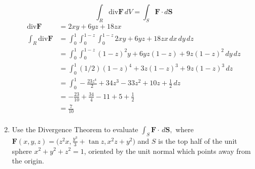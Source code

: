 \documentclass{article}
\newcommand{\divt}{\text{div}}
\begin{document}
\begin{enumerate}
            \[\int_R \divt \boldsymbol F \, dV = \int_S \boldsymbol F \cdot d\boldsymbol S\]
            \begin{align*}
                \divt \boldsymbol F &= 2xy + 6yz + 18zx \\
                \int_R \divt \boldsymbol F &= \int_0^1 \int_0^{1-z} \int_0^{1-z} 2xy + 6yz + 18zx \, dx \, dy \, dz \\
                &= \int_0^1 \int_0^{1-z} (1-z)^2y + 6yz(1-z) + 9z(1-z)^2 \, dy \, dz \\
                &= \int_0^1 (1/2)(1-z)^4 + 3z(1-z)^3 + 9z(1-z)^3 \, dz \\
                &= \int_0^1 -\frac{23z^4}{2} + 34z^3 - 33z^2 + 10z + \frac{1}{2} \, dz \\
                &= -\frac{23}{10} + \frac{34}{4} - 11 + 5 + \frac{1}{2} \\
                &= \frac{7}{10} \\ 
            \end{align*}
            \newpage
\item Use the Divergence Theorem to evaluate $\displaystyle \int_S \boldsymbol F \cdot \, d \boldsymbol S,$ where $\displaystyle \boldsymbol F (x,y,z) = \bigg(z^2 x, \frac{y^3}{3} + \tan z, x^2z+y^2 \bigg)$ and $S$ is the top half of the unit sphere $x^2 + y^2 + z^2 = 1$, oriented by the unit normal which points away from the origin.
    

\end{enumerate}
\end{document}
